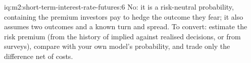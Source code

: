 \begin{solution}{iq:m2:short-term-interest-rate-futures:6}
No: it is a risk-neutral probability, containing the premium investors pay to
hedge the outcome they fear; it also assumes two outcomes and a known turn and
spread. To convert: estimate the risk premium (from the history of implied
against realised decisions, or from surveys), compare with your own model's
probability, and trade only the difference net of costs.
\end{solution}
